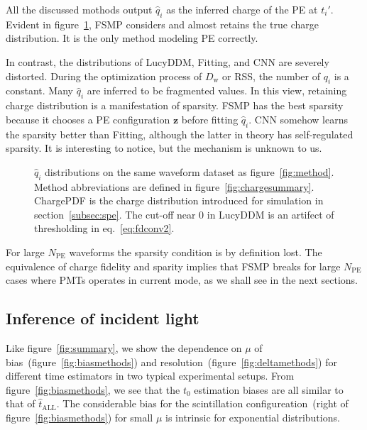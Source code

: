 All the discussed mothods output $\hat{q}_i$ as the inferred charge of the PE at $t_i'$.  Evident in figure~\ref{fig:recchargehist}, FSMP considers and almost retains the true charge distribution.  It is the only method modeling PE correctly.

In contrast, the distributions of LucyDDM, Fitting, and CNN are severely distorted.  During the optimization process of $D_\mathrm{w}$ or RSS, the number of $q_i$ is a constant. Many $\hat{q}_i$ are inferred to be fragmented values.  In this view, retaining charge distribution is a manifestation of sparsity.  FSMP has the best sparsity because it chooses a PE configuration $\bm{z}$ before fitting $\hat{q}_i$.  CNN somehow learns the sparsity better than Fitting, although the latter in theory has self-regulated sparsity.  It is interesting to notice, but the mechanism is unknown to us.

\begin{figure}[H]
  \centering
  \resizebox{0.6\textwidth}{!}{}
  \caption{\label{fig:recchargehist} $\hat{q}_i$ distributions on the same waveform dataset as figure~\ref{fig:method}.  Method abbreviations are defined in figure~\ref{fig:chargesummary}. ChargePDF is the charge distribution introduced for simulation in section~\ref{subsec:spe}. The cut-off near 0 in LucyDDM is an artifect of thresholding in eq.~\eqref{eq:fdconv2}.}
\end{figure}

For large $N_\mathrm{PE}$ waveforms the sparsity condition is by definition lost.  The equivalence of charge fidelity and sparity implies that FSMP breaks for large $N_\mathrm{PE}$ cases where PMTs operates in current mode, as we shall see in the next sections.

\subsection{Inference of incident light}
\label{subsec:timeresolution}

Like figure~\ref{fig:summary}, we show the dependence on $\mu$ of bias~(figure~\ref{fig:biasmethods}) and resolution~(figure~\ref{fig:deltamethods}) for different time estimators in two typical experimental setups.  From figure~\ref{fig:biasmethods}, we see that the $t_0$ estimation biases are all similar to that of $\hat{t}_\mathrm{ALL}$. The considerable bias for the scintillation configureation~(right of figure~\ref{fig:biasmethods}) for small $\mu$ is intrinsic for exponential distributions.

